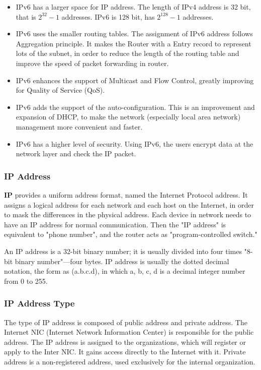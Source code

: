\begin{itemize}
	\item IPv6 has a larger space for IP address. The length of IPv4 address is 32 bit, that is $ 2^{32} - 1 $ addresses. IPv6 is 128 bit, has $2^{128} - 1 $ addresses.
	\item IPv6 uses the smaller routing tables. The assignment of IPv6 address follows Aggregation principle. It makes the Router with a Entry record to represent lots of the subnet, in order to reduce the length of the routing table and improve the speed of packet forwarding in router.
	\item IPv6 enhances the support of Multicast and Flow Control, greatly improving for Quality of Service (QoS).
	\item IPv6 adds the support of the auto-configuration. This is an improvement and expansion of DHCP, to make the network (especially local area network) management more convenient and faster.
	\item IPv6 has a higher level of security. Using IPv6, the users encrypt data at the network layer and check the IP packet.
\end{itemize}

\subsubsection{IP Address}

\textbf{IP} provides a uniform address format, named the Internet Protocol address. It assigns a logical address for each network and each host on the Internet, in order to mask the differences in the physical address. Each device in network needs to have an IP address for normal communication. Then the "IP address" is equivalent to "phone number", and the router acts as "program-controlled switch."  

An IP address is a 32-bit binary number; it is usually divided into four times "8-bit binary number"---four bytes. IP address is usually the dotted decimal notation, the form as (a.b.c.d), in which a, b, c, d is a decimal integer number from 0 to 255.  

\subsubsection{IP Address Type}

The type of IP address is composed of public address and private address.  
The Internet NIC (Internet Network Information Center) is responsible for the public address. The IP address is assigned to the organizations, which will register or apply to the Inter NIC. It gains access directly to the Internet with it. Private address is a non-registered address, used exclusively for the internal organization.  

